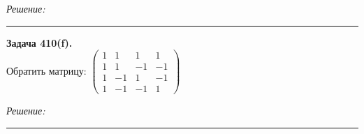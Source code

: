 \documentclass[a4paper, 12pt]{article}
\newenvironment{problem}[2][Задача]
    { \begin{mdframed}[backgroundcolor=gray!10] \textbf{#1 #2.} \\}
    {  \end{mdframed}}
\newenvironment{solution}
    {\textit{Решение: }}
    {\noindent\rule{7in}{1.5pt}}
\begin{document}
\begin{solution}
\end{solution}

\begin{problem}{410(f)}
Обратить матрицу:
$\left(\begin{array}{rrrr}1 & 1 & 1 & 1\\1 & 1 & -1 & -1\\ 1 & -1 & 1 & -1 \\ 1 & -1 & -1 & 1\end{array}\right)$

\end{problem}
\begin{solution}


\end{solution}
\end{document}
